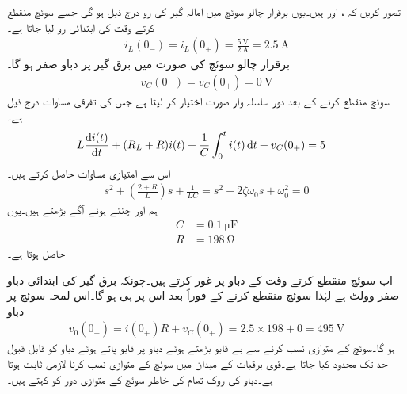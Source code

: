 تصور کریں کہ ،  اور  ہیں۔یوں برقرار چالو سوئچ میں امالہ گیر کی رو درج ذیل ہو گی جسے سوئچ منقطع کرتے وقت کی ابتدائی رو لیا جاتا ہے۔ 
\begin{align*}
i_L(0_-)=i_L(0_+)=\frac{\SI{5}{\volt}}{\SI{2}{\ampere}}=\SI{2.5}{\ampere}
\end{align*} 
برقرار چالو سوئچ کی صورت میں برق گیر پر دباو صفر ہو گا۔
\begin{align*}
v_C(0_-)=v_C(0_+)=\SI{0}{\volt}
\end{align*} 
سوئچ منقطع کرنے کے بعد دور سلسلہ وار  صورت اختیار کر لیتا ہے جس کی تفرقی مساوات درج ذیل ہے۔
\begin{align}\label{مساوات_عارضی_تفرقی_دو_درجی_مثال}
L\frac{\dif i(t)}{\dif t}+(R_L+R) i(t)+\frac{1}{C}\int_{0}^{t} i(t) \dif t+v_C(0_+)&=5
\end{align}
اس سے امتیازی مساوات حاصل کرتے ہیں۔
\begin{align*}
s^2+\left(\frac{2+R}{L}\right)s+\frac{1}{LC}=s^2+2\zeta\omega_0 s+\omega_0^2=0
\end{align*}
ہم  اور  چنتے ہوئے آگے بڑھتے ہیں۔یوں
\begin{align*}
C&=\SI{0.1}{\micro\farad}\\
R&=\SI{198}{\ohm}
\end{align*}
حاصل ہوتا ہے۔

اب سوئچ منقطع کرتے وقت کے دباو پر غور کرتے ہیں۔چونکہ برق گیر کی ابتدائی دباو صفر وولٹ ہے لہٰذا سوئچ منقطع کرنے کے فوراً بعد اس پر  ہی ہو گا۔اس لمحہ سوئچ پر دباو
\begin{align*}
v_0(0_+)=i(0_+)R+v_C(0_+)=2.5\times 198+0=\SI{495}{\volt}
\end{align*}
ہو گا۔سوئچ کے متوازی  نسب کرنے سے بے قابو بڑھتے ہوئے دباو پر قابو پاتے ہوئے دباو کو قابل قبول حد تک محدود کیا جاتا ہے۔قوی برقیات کے میدان میں سوئچ کے متوازی  نسب کرنا لازمی ثابت ہوتا ہے۔دباو کی روک تھام کی خاطر سوئچ کے متوازی  دور کو  کہتے ہیں۔


